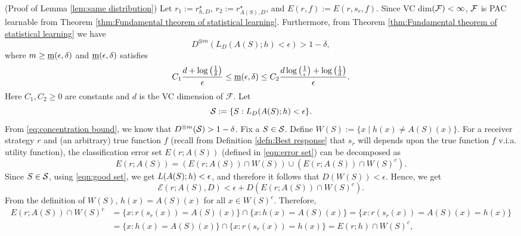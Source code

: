 \begin{apdxproof}(Proof of Lemma \ref{lem:same distribution})\label{proof:same distribution}
Let $r_1 := r^\star_{h,D}$, $r_2 := r^\star_{A(S),D}$, and $E(r,f) := E(r,s_r,f)$.
Since VC dim$(\mathcal{F}) < \infty$,  $\mathcal{F}$ is PAC learnable from Theorem \ref{thm:Fundamental theorem of statistical learning}. Furthermore, from Theorem  \ref{thm:Fundamental theorem of statistical learning} we have
\begin{equation}\label{eq:concentration bound}
    D^{\otimes m}(L_{D}(A(S);h) < \epsilon) > 1 - \delta,
\end{equation}
where $m \geq \underbar{m}(\epsilon,\delta)$ and $\underbar{m}(\epsilon,\delta)$ satisfies 
\begin{equation*}
    C_1 \frac{d + \log\left(\frac{1}{\delta}\right)}{\epsilon} \leq \underbar{m}(\epsilon,\delta) \leq C_2 \frac{d \log\left(\frac{1}{\epsilon}\right) + \log\left(\frac{1}{\delta}\right)}{\epsilon}.
\end{equation*}
Here $C_1, C_2 \geq 0$ are constants and $d$ is the VC dimension of $\mathcal{F}$.
Let 
\begin{equation}\label{eqn:good set}
    \mathcal{S} := \{S: L_D(A(S);h) < \epsilon\}.
\end{equation}
From \eqref{eq:concentration bound}, we know that $D^{\otimes m}(\mathcal{S}) > 1-\delta$.
Fix a $S \in \mathcal{S}$. Define $W(S) := \{x \mid h(x) \neq A(S)(x)\}$. For a receiver strategy $r$ and (an arbitrary) true function $f$ (recall from Definition \ref{defn:Best response} that $s_r$ will depends upon the true function $f$ v.i.a. utility function), the classification error set $E(r;A(S))$ (defined in \eqref{eqn:error set}) can be decomposed as
\[
E(r; A(S)) = (E(r; A(S)) \cap W(S)) \cup (E(r; A(S)) \cap W(S)^c).
\]
Since $S \in \mathcal{S}$, using \eqref{eqn:good set}, we get $L(A(S);h) < \epsilon$, and therefore it follows that $D(W(S)) < \epsilon$. Hence, we get
\[
\mathcal{E}(r; A(S),D) < \epsilon + D(E(r; A(S)) \cap W(S)^c).
\]
From the definition of $W(S)$, $h(x) = A(S)(x)$ for all $x \in W(S)^c$. Therefore,
\begin{equation}
    \begin{aligned}
        E(r;A(S)) \cap W(S)^c &= \{x:r(s_r(x)) = A(S)(x)\} \cap \{x: h(x) =A(S)(x)\} = \{x:r(s_r(x)) = A(S)(x) = h(x)\}\\  &= \{x: h(x) =A(S)(x)\} \cap\{x:r(s_r(x)) =h(x) \}      
        = E(r;h) \cap W(S)^c,\\
    \end{aligned}
\end{equation}

\end{apdxproof}
